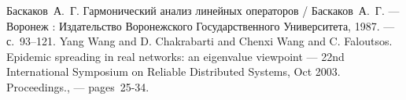 \documentclass[12pt]{article}
\theoremstyle{definition}
\theoremstyle{plain}
\theoremstyle{remark}
\begin{document}
\begin{thebibliography}{9}
  Баскаков~А.~Г. Гармонический анализ линейных операторов
    / Баскаков~А.~Г.
    --- Воронеж : Издательство Воронежского Государственного Университета,
        1987.
    ---  с.~93--121.
  Yang Wang and D. Chakrabarti and Chenxi Wang and C. Faloutsos.
    Epidemic spreading in real networks: an eigenvalue viewpoint
        --- 22nd International Symposium on Reliable Distributed Systems, Oct 2003. Proceedings., --- pages~25-34.
\end{thebibliography}
\end{document}
